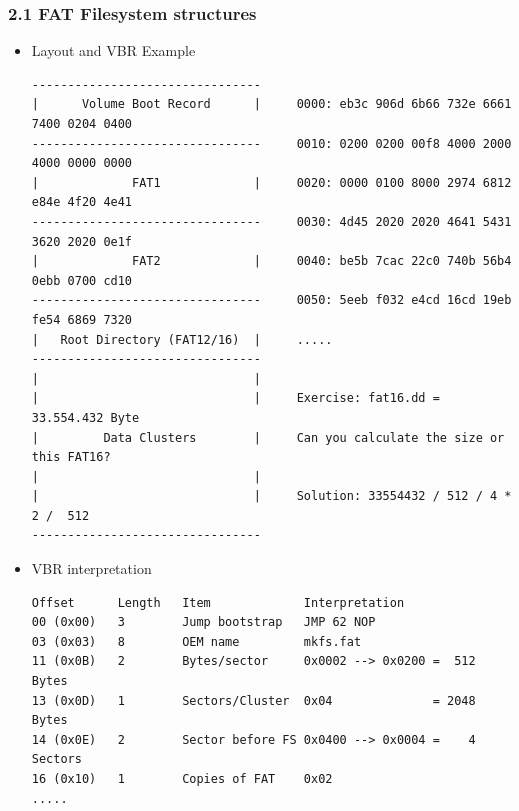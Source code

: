 \begin{frame}[fragile]
  \frametitle{2.1 FAT Filesystem structures}
    \begin{itemize}
	    \item Layout and VBR Example
  \begin{lstlisting}[basicstyle=\tiny]
--------------------------------
|      Volume Boot Record      |     0000: eb3c 906d 6b66 732e 6661 7400 0204 0400
--------------------------------     0010: 0200 0200 00f8 4000 2000 4000 0000 0000
|             FAT1             |     0020: 0000 0100 8000 2974 6812 e84e 4f20 4e41
--------------------------------     0030: 4d45 2020 2020 4641 5431 3620 2020 0e1f
|             FAT2             |     0040: be5b 7cac 22c0 740b 56b4 0ebb 0700 cd10
--------------------------------     0050: 5eeb f032 e4cd 16cd 19eb fe54 6869 7320
|   Root Directory (FAT12/16)  |     .....
--------------------------------
|                              |
|                              |     Exercise: fat16.dd = 33.554.432 Byte
|         Data Clusters        |     Can you calculate the size or this FAT16?
|                              |
|                              |     Solution: 33554432 / 512 / 4 * 2 /  512
--------------------------------     
  \end{lstlisting}
	    \item VBR interpretation                      
  \begin{lstlisting}[basicstyle=\tiny]
Offset      Length   Item             Interpretation
00 (0x00)   3        Jump bootstrap   JMP 62 NOP
03 (0x03)   8        OEM name         mkfs.fat
11 (0x0B)   2        Bytes/sector     0x0002 --> 0x0200 =  512 Bytes
13 (0x0D)   1        Sectors/Cluster  0x04              = 2048 Bytes
14 (0x0E)   2        Sector before FS 0x0400 --> 0x0004 =    4 Sectors
16 (0x10)   1        Copies of FAT    0x02
.....
  \end{lstlisting}
    \end{itemize}
\end{frame}


